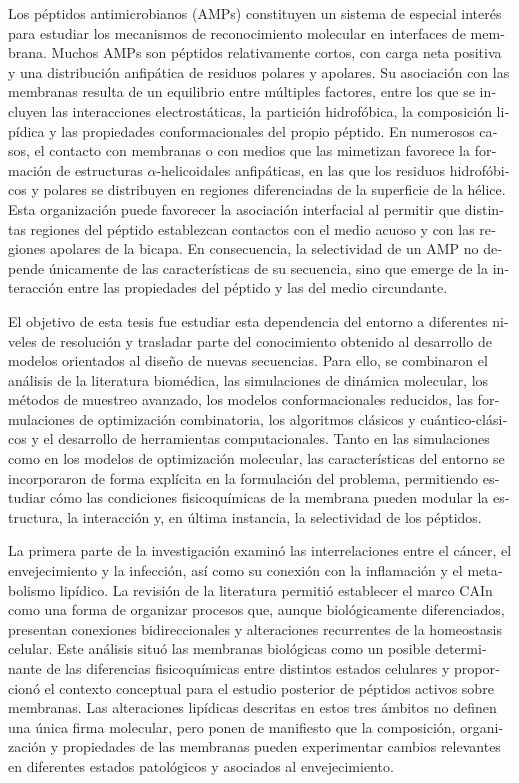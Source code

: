 \begin{otherlanguage}{spanish}
Los péptidos antimicrobianos (AMPs) constituyen un sistema de especial interés para estudiar los mecanismos de reconocimiento molecular en interfaces de membrana. Muchos AMPs son péptidos relativamente cortos, con carga neta positiva y una distribución anfipática de residuos polares y apolares. Su asociación con las membranas resulta de un equilibrio entre múltiples factores, entre los que se incluyen las interacciones electrostáticas, la partición hidrofóbica, la composición lipídica y las propiedades conformacionales del propio péptido. En numerosos casos, el contacto con membranas o con medios que las mimetizan favorece la formación de estructuras $\alpha$-helicoidales anfipáticas, en las que los residuos hidrofóbicos y polares se distribuyen en regiones diferenciadas de la superficie de la hélice. Esta organización puede favorecer la asociación interfacial al permitir que distintas regiones del péptido establezcan contactos con el medio acuoso y con las regiones apolares de la bicapa. En consecuencia, la selectividad de un AMP no depende únicamente de las características de su secuencia, sino que emerge de la interacción entre las propiedades del péptido y las del medio circundante.

El objetivo de esta tesis fue estudiar esta dependencia del entorno a diferentes niveles de resolución y trasladar parte del conocimiento obtenido al desarrollo de modelos orientados al diseño de nuevas secuencias. Para ello, se combinaron el análisis de la literatura biomédica, las simulaciones de dinámica molecular, los métodos de muestreo avanzado, los modelos conformacionales reducidos, las formulaciones de optimización combinatoria, los algoritmos clásicos y cuántico-clásicos y el desarrollo de herramientas computacionales. Tanto en las simulaciones como en los modelos de optimización molecular, las características del entorno se incorporaron de forma explícita en la formulación del problema, permitiendo estudiar cómo las condiciones fisicoquímicas de la membrana pueden modular la estructura, la interacción y, en última instancia, la selectividad de los péptidos.

La primera parte de la investigación examinó las interrelaciones entre el cáncer, el envejecimiento y la infección, así como su conexión con la inflamación y el metabolismo lipídico. La revisión de la literatura permitió establecer el marco CAIn como una forma de organizar procesos que, aunque biológicamente diferenciados, presentan conexiones bidireccionales y alteraciones recurrentes de la homeostasis celular. Este análisis situó las membranas biológicas como un posible determinante de las diferencias fisicoquímicas entre distintos estados celulares y proporcionó el contexto conceptual para el estudio posterior de péptidos activos sobre membranas. Las alteraciones lipídicas descritas en estos tres ámbitos no definen una única firma molecular, pero ponen de manifiesto que la composición, organización y propiedades de las membranas pueden experimentar cambios relevantes en diferentes estados patológicos y asociados al envejecimiento.


\end{otherlanguage}

